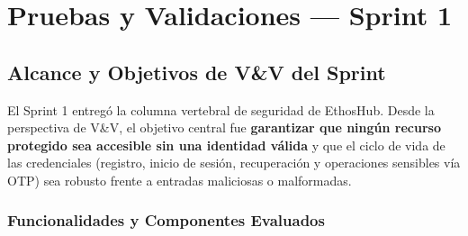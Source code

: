 \chapter{Pruebas y Validaciones — Sprint 1}
\label{ch:sprint1}

\section{Alcance y Objetivos de V\&V del Sprint}
\label{sec:s1-alcance}

El Sprint 1 entregó la columna vertebral de seguridad de EthosHub. Desde la perspectiva de
V\&V, el objetivo central fue \textbf{garantizar que ningún recurso protegido sea accesible
sin una identidad válida} y que el ciclo de vida de las credenciales (registro, inicio de
sesión, recuperación y operaciones sensibles vía OTP) sea robusto frente a entradas
maliciosas o malformadas.

\subsection{Funcionalidades y Componentes Evaluados}
\label{sec:s1-funcionalidades}

